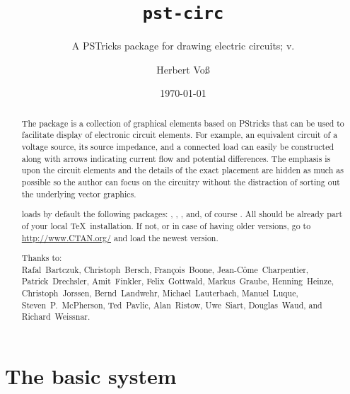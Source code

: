 \documentclass[11pt,english,BCOR10mm,DIV12,bibliography=totoc,parskip=false,smallheadings
    headexclude,footexclude,oneside]{pst-doc}
\let\pstCircFV\fileversion
\begin{document}
\title{\texttt{pst-circ}}
\subtitle{A PSTricks package for drawing electric circuits; v.\pstCircFV}
\author{%
Herbert Vo\ss}
\date{\today}
\maketitle

\tableofcontents

\clearpage

\begin{abstract}
\noindent
The package  is a collection of graphical elements based
on PStricks that can be used to facilitate display of electronic
circuit elements. For example, an equivalent circuit of a voltage
source, its source impedance, and a connected load can easily be
constructed along with arrows indicating current flow and potential
differences. The emphasis is upon the circuit elements and the
details of the exact placement are hidden as much as possible so the
author can focus on the circuitry without the distraction of sorting
out the underlying vector graphics.

 loads by default the following packages: , 
, , and, of course .
All should be already part of your local \TeX\ installation. If not, or in case
of having older versions, go to \url{http://www.CTAN.org/} and load the newest version.

\vfill\noindent
\begingroup\setlength\emergencystretch{3em}\raggedright
\sloppy
Thanks to: \\
\mbox{Rafal Bartczuk},
\mbox{Christoph Bersch}, 
\mbox{Fran\c{c}ois Boone}, 
    \mbox{Jean-C\^ome Charpentier},
    \mbox{Patrick Drechsler},
    \mbox{Amit Finkler},
    \mbox{Felix Gottwald},
    \mbox{Markus Graube},
    \mbox{Henning Heinze},
    \mbox{Christoph Jorssen},
    \mbox{Bernd Landwehr},
    \mbox{Michael Lauterbach},
    \mbox{Manuel Luque}, 
    \mbox{Steven P. McPherson}, 
    \mbox{Ted Pavlic}, 
    \mbox{Alan Ristow},
    \mbox{Uwe Siart},
\mbox{Douglas Waud}, and
\mbox{Richard Weissnar}.
\endgroup
\end{abstract}

\clearpage

\section{The basic system}
\end{document}
